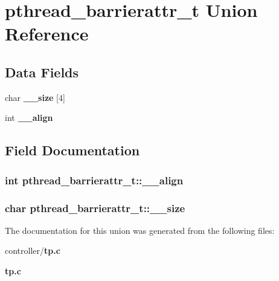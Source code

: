 \section{pthread\_\-barrierattr\_\-t Union Reference}
\label{unionpthread__barrierattr__t}
\subsection*{Data Fields}
\begin{DoxyCompactItemize}
\item 
char {\bf \_\-\_\-size} [4]
\item 
int {\bf \_\-\_\-align}
\end{DoxyCompactItemize}


\subsection{Field Documentation}
\subsubsection[{\_\-\_\-align}]{\setlength{\rightskip}{0pt plus 5cm}int {\bf pthread\_\-barrierattr\_\-t::\_\-\_\-align}}\label{unionpthread__barrierattr__t_affc673be91f5bb300851cd5b49d1f9e8}
\subsubsection[{\_\-\_\-size}]{\setlength{\rightskip}{0pt plus 5cm}char {\bf pthread\_\-barrierattr\_\-t::\_\-\_\-size}}\label{unionpthread__barrierattr__t_af6bc84b5d92818e324085b9fce792573}


The documentation for this union was generated from the following files:\begin{DoxyCompactItemize}
\item 
controller/{\bf tp.c}\item 
{\bf tp.c}\end{DoxyCompactItemize}
